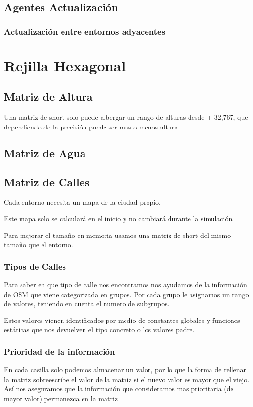 \subsection*{Agentes Actualización}
\subsubsection*{Actualización entre entornos adyacentes}
\section*{Rejilla Hexagonal}
\subsection*{Matriz de Altura}
Una matriz de short solo puede albergar un rango de alturas desde +-32,767, que
dependiendo de la precisión puede ser mas o menos altura
\subsection*{Matriz de Agua}
\subsection*{Matriz de Calles}
Cada entorno necesita un mapa de la ciudad propio.

Este mapa solo se calculará en el inicio y no cambiará durante la simulación.

Para mejorar el tamaño en memoria usamos una matriz de short del mismo tamaño
que el entorno.
\subsubsection*{Tipos de Calles}
Para saber en que tipo de calle nos encontramos nos ayudamos de la información
de OSM que viene categorizada en grupos. Por cada grupo le asignamos un rango
de valores, teniendo en cuenta el numero de subgrupos.

Estos valores vienen identificados por medio de constantes globales y funciones
estáticas que nos devuelven el tipo concreto o los valores padre.
\subsubsection*{Prioridad de la información}
En cada casilla solo podemos almacenar un valor, por lo que la forma de
rellenar la matriz sobreescribe el valor de la matriz si el nuevo valor es
mayor que el viejo. Así nos aseguramos que la información que consideramos mas
prioritaria (de mayor valor) permanezca en la matriz
